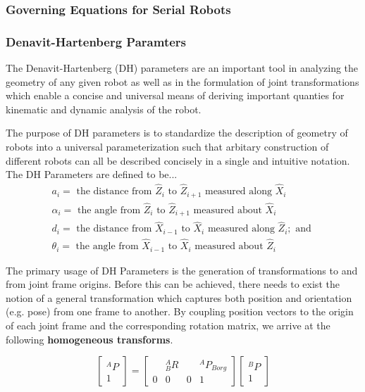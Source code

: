 \documentclass[journal]{IEEEtran}
\begin{document}
\subsubsection{Governing Equations for Serial Robots}







\subsubsection{Denavit-Hartenberg Paramters}
The Denavit-Hartenberg (DH) parameters are an important tool in analyzing the geometry of any given robot as well as in the formulation of joint transformations which enable a concise and universal means of deriving important quanties for kinematic and dynamic analysis of the robot.

The purpose of DH parameters is to standardize the description of geometry of robots into a universal parameterization such that arbitary construction of different robots can all be described concisely in a single and intuitive notation. \\

\noindent The DH Parameters are defined to be...
$$
\begin{array}{l}
a_{i}=\text { the distance from } \hat{Z}_{i} \text { to } \hat{Z}_{i+1} \text { measured along } \hat{X}_{i} \\
\alpha_{i}=\text { the angle from } \hat{Z}_{i} \text { to } \hat{Z}_{i+1} \text { measured about } \hat{X}_{i} \\
d_{i}=\text { the distance from } \hat{X}_{i-1} \text { to } \hat{X}_{i} \text { measured along } \hat{Z}_{i} ; \text { and } \\
\theta_{i}=\text { the angle from } \hat{X}_{i-1} \text { to } \hat{X}_{i} \text { measured about } \hat{Z}_{i}
\end{array}
$$

The primary usage of DH Parameters is the generation of transformations to and from joint frame origins. Before this can be achieved, there needs to exist the notion of a general transformation which captures both position and orientation (e.g. pose) from one frame to another. By coupling position vectors to the origin of each joint frame and the corresponding rotation matrix, we arrive at the following \textbf{homogeneous transforms}.


$$
\left[\begin{array}{c}
{}^{A}P \\
1
\end{array}\right]=\left[\begin{array}{ccc|c}
{} & {}^{A}_{B}R & & {}^{A}P_{B org} \\
\hline 0 & 0 & 0 & 1
\end{array}\right]\left[\begin{array}{c}
{}^{B}P \\
1
\end{array}\right]
$$
\end{document}
